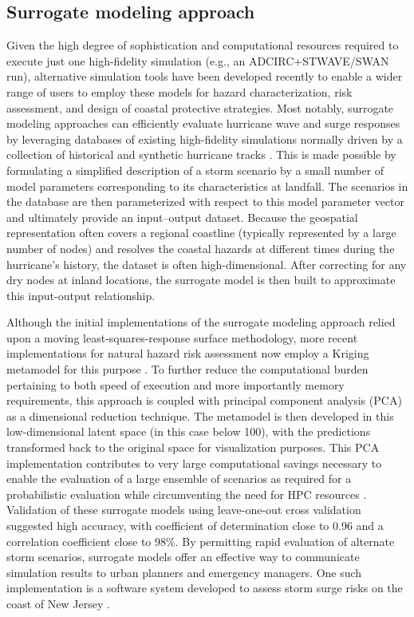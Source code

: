 \subsection{Surrogate modeling approach}

Given the high degree of sophistication and computational resources required to execute just one high-fidelity simulation (e.g., an ADCIRC+STWAVE/SWAN run), alternative simulation tools have been developed recently to enable a wider range of users to employ these models for hazard characterization, risk assessment, and design of coastal protective strategies. Most notably, surrogate modeling approaches can efficiently evaluate hurricane wave and surge responses by leveraging databases of existing high-fidelity simulations normally driven by a collection of historical and synthetic hurricane tracks \citep{usace2015north}. This is made possible by formulating a simplified description of a storm scenario by a small number of model parameters corresponding to its characteristics at landfall. The scenarios in the database are then parameterized with respect to this model parameter vector and ultimately provide an input–output dataset. Because the geospatial representation often covers a regional coastline (typically represented by a large number of nodes) and resolves the coastal hazards at different times during the hurricane’s history, the dataset is often high-dimensional. After correcting for any dry nodes at inland locations, the surrogate model is then built to approximate this input-output relationship. 

Although the initial implementations of the surrogate modeling approach relied upon a moving least-squares-response surface methodology, more recent implementations for natural hazard risk assessment now employ a Kriging metamodel for this purpose \citep{jia2013kriging}. To further reduce the computational burden pertaining to both speed of execution and more importantly memory requirements, this approach is coupled with principal component analysis (PCA) as a dimensional reduction technique. The metamodel is then developed in this low-dimensional latent space (in this case below 100), with the predictions transformed back to the original space for visualization purposes. This PCA implementation contributes to very large computational savings necessary to enable the evaluation of a large ensemble of scenarios as required for a probabilistic evaluation while circumventing the need for HPC resources \citep{jia2013kriging}. Validation of these surrogate models using leave-one-out cross validation \citep{taflanidis2017advances} suggested high accuracy, with coefficient of determination close to 0.96 and a correlation coefficient close to 98\%. By permitting rapid evaluation of alternate storm scenarios, surrogate models offer an effective way to communicate simulation results to urban planners and emergency managers. One such implementation is a software system developed to assess storm surge risks on the coast of New Jersey \citep{njcoast2018implementation}.

